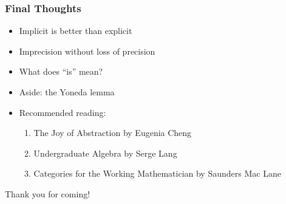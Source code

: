 \documentclass{beamer}
\begin{document}
\begin{frame}
  \frametitle{Final Thoughts}

  \begin{itemize}
    \item Implicit is better than explicit
    \item Imprecision without loss of precision
    \item What does ``is'' mean?
    \item Aside: the Yoneda lemma
    \item Recommended reading:
      \begin{enumerate}
        \item The Joy of Abstraction by Eugenia Cheng
        \item Undergraduate Algebra by Serge Lang
        \item Categories for the Working Mathematician by Saunders Mac Lane
      \end{enumerate}
  \end{itemize} \pause

  \begin{center} \Huge
    Thank you for coming!
  \end{center}
\end{frame}
\end{document}
